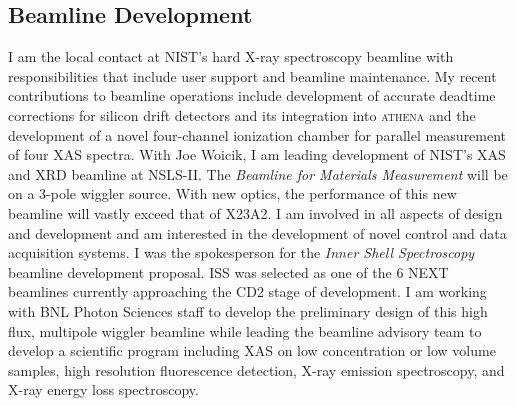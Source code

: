 \documentclass[11pt]{moderncv}
\begin{document}
\subsection{Beamline Development}
%
{I am the local contact at NIST's hard X-ray spectroscopy beamline
  with responsibilities that include user support and beamline
  maintenance.  My recent contributions to beamline operations include
  development of accurate deadtime corrections for silicon drift
  detectors and its integration into \textsc{athena} and the
  development of a novel four-channel ionization chamber for parallel
  measurement of four XAS spectra.}
%
%
{With Joe Woicik, I am leading development of NIST's XAS and XRD
  beamline at NSLS-II.  The \textit{Beamline for Materials
    Measurement} will be on a 3-pole wiggler source.  With new optics,
  the performance of this new beamline will vastly exceed that of
  X23A2.  I am involved in all aspects of design and development and
  am interested in the development of novel control and data
  acquisition systems.}
%
%
{I was the spokesperson for the \textit{Inner Shell Spectroscopy}
  beamline development proposal.  ISS was selected as one of the 6
  NEXT beamlines currently approaching the CD2 stage of development.
  I am working with BNL Photon Sciences staff to develop the
  preliminary design of this high flux, multipole wiggler beamline
  while leading the beamline advisory team to develop a scientific
  program including XAS on low concentration or low volume samples,
  high resolution fluorescence detection, X-ray emission spectroscopy,
  and X-ray energy loss spectroscopy.}



\end{document}
